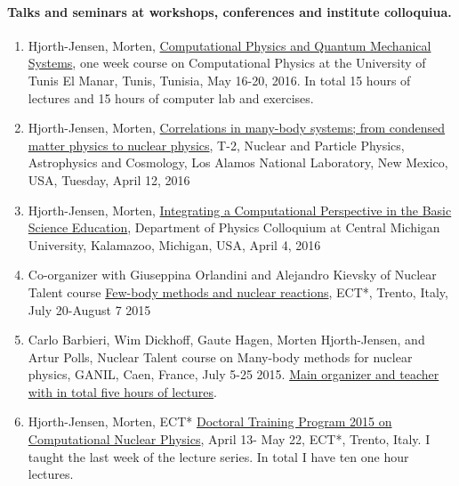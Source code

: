 \documentclass[%
oneside,                 %
final,                   %
10pt]{article}
\begin{document}
\paragraph{Talks and seminars at workshops, conferences and institute colloquiua.}
\begin{enumerate}
\item Hjorth-Jensen, Morten, \href{{http://compphysics.github.io/CompPhysUTunis/doc/web/course.html}}{Computational Physics and Quantum Mechanical Systems}, one week course on Computational Physics at the University of Tunis El Manar, Tunis, Tunisia, May 16-20, 2016. In total 15 hours of lectures and 15 hours of computer lab and exercises. 

\item Hjorth-Jensen, Morten, \href{{https://t2.lanl.gov/seminars/?section=abstract&number=-10&year=2016}}{Correlations in many-body systems; from condensed matter physics to nuclear physics}, T-2, Nuclear and Particle Physics, Astrophysics and Cosmology, Los Alamos National Laboratory, New Mexico, USA, Tuesday, April 12, 2016

\item Hjorth-Jensen, Morten, \href{{http://mhjensenseminars.github.io/EducationalSeminars/doc/pub/cse/html/cse-reveal.html}}{Integrating a Computational Perspective in the Basic Science Education}, Department of Physics Colloquium at Central  Michigan University,  Kalamazoo, Michigan, USA, April 4, 2016

\item Co-organizer with Giuseppina Orlandini and Alejandro Kievsky of Nuclear Talent course \href{{https://groups.nscl.msu.edu/jina/talent/wiki/Course_3}}{Few-body methods and nuclear reactions}, ECT*, Trento, Italy, July 20-August 7 2015

\item Carlo Barbieri, Wim Dickhoff, Gaute Hagen, Morten Hjorth-Jensen, and Artur Polls, Nuclear Talent course on Many-body methods for nuclear physics, GANIL, Caen, France, July 5-25 2015. \href{{http://nucleartalent.github.io/Course2ManyBodyMethods/doc/web/course.html}}{Main organizer and teacher with in total five hours of lectures}. 

\item Hjorth-Jensen, Morten, ECT* \href{{http://www.ectstar.eu/node/1287}}{Doctoral Training Program 2015 on Computational Nuclear Physics}, April 13- May 22, ECT*, Trento, Italy. I taught the last week of the lecture series. In total I have ten one hour lectures. 


\end{enumerate}
\end{document}
